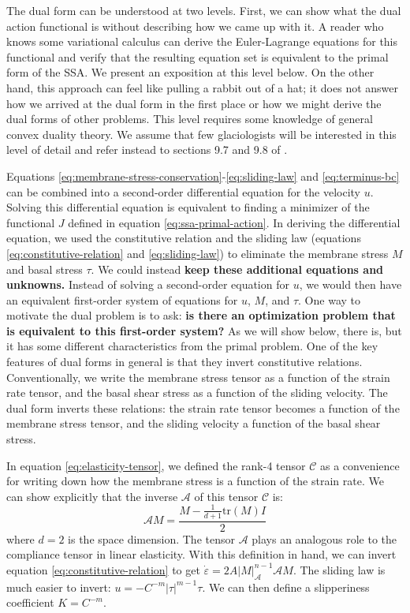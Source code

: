 \documentclass[twocolumn,letterpaper]{igs}
\begin{document}
The dual form can be understood at two levels.
First, we can show what the dual action functional is without describing how we came up with it.
A reader who knows some variational calculus can derive the Euler-Lagrange equations for this functional and verify that the resulting equation set is equivalent to the primal form of the SSA.
We present an exposition at this level below.
On the other hand, this approach can feel like pulling a rabbit out of a hat; it does not answer how we arrived at the dual form in the first place or how we might derive the dual forms of other problems.
This level requires some knowledge of general convex duality theory.
We assume that few glaciologists will be interested in this level of detail and refer instead to sections 9.7 and 9.8 of \citet{attouch2014variational}.

Equations \eqref{eq:membrane-stress-conservation}-\eqref{eq:sliding-law} and \eqref{eq:terminus-bc} can be combined into a second-order differential equation for the velocity $u$.
Solving this differential equation is equivalent to finding a minimizer of the functional $J$ defined in equation \eqref{eq:ssa-primal-action}.
In deriving the differential equation, we used the constitutive relation and the sliding law (equations \eqref{eq:constitutive-relation} and \eqref{eq:sliding-law}) to eliminate the membrane stress $M$ and basal stress $\tau$.
We could instead \textbf{keep these additional equations and unknowns.}
Instead of solving a second-order equation for $u$, we would then have an equivalent first-order system of equations for $u$, $M$, and $\tau$.
One way to motivate the dual problem is to ask: \textbf{is there an optimization problem that is equivalent to this first-order system?}
As we will show below, there is, but it has some different characteristics from the primal problem.
One of the key features of dual forms in general is that they invert constitutive relations.
Conventionally, we write the membrane stress tensor as a function of the strain rate tensor, and the basal shear stress as a function of the sliding velocity.
The dual form inverts these relations: the strain rate tensor becomes a function of the membrane stress tensor, and the sliding velocity a function of the basal shear stress.

In equation \eqref{eq:elasticity-tensor}, we defined the rank-4 tensor $\mathscr{C}$ as a convenience for writing down how the membrane stress is a function of the strain rate.
We can show explicitly that the inverse $\mathscr{A}$ of this tensor $\mathscr{C}$ is:
\begin{equation}
    \mathscr{A}M = \frac{M - \frac{1}{d + 1}\text{tr}(M)I}{2}
\end{equation}
where $d = 2$ is the space dimension.
The tensor $\mathscr{A}$ plays an analogous role to the compliance tensor in linear elasticity.
With this definition in hand, we can invert equation \eqref{eq:constitutive-relation} to get $\dot\varepsilon = 2A|M|_{\mathscr{A}}^{n - 1}\mathscr{A}M$.
The sliding law is much easier to invert: $u = -C^{-m}|\tau|^{m - 1}\tau$.
We can then define a slipperiness coefficient $K = C^{-m}$.
\end{document}
